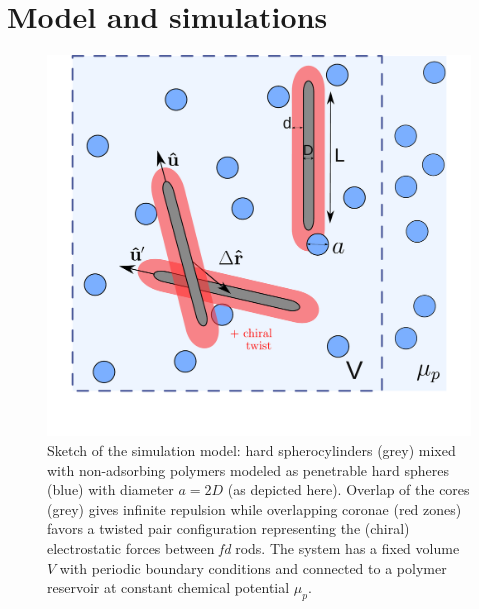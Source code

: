 


\section{Model and simulations}

\begin{figure}
	\includegraphics[width = 0.6\columnwidth]{figures/chapter-5/spheromans}
	\caption{ Sketch of the simulation model: hard spherocylinders (grey) mixed with non-adsorbing polymers modeled as penetrable hard spheres (blue) with diameter $a = 2D$ (as depicted here). Overlap of the cores (grey) gives infinite repulsion while overlapping coronae (red zones) favors a twisted pair configuration representing the (chiral) electrostatic forces between {\em fd} rods. The system has a fixed volume $V$ with periodic boundary conditions and connected to a polymer reservoir at constant chemical potential $\mu_p$. }
	\label{sketch}
\end{figure}


